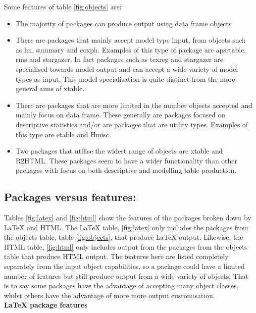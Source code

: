 \documentclass{memoir}\usepackage[]{graphicx}\usepackage[]{color}
\newcommand{\pkg}[1]{{\fontseries{b}\selectfont #1}}
\newcommand{\latex}{\LaTeX\xspace}
\begin{document}
Some features of table \ref{fig:objects} are:
\begin{itemize}
\item The majority of packages can produce output using data frame objects
\item There are packages that mainly accept model type input, from objects such as lm, summary and coxph. Examples of this type of package are \pkg{apsrtable}\cite{apsrtable}, \pkg{rms}\cite{rms} and \pkg{stargazer}. In fact packages such as \pkg{texreg}\cite{texreg} and \pkg{stargazer} are specialised towards model output and can accept a wide variety of model types as input. This model specialisation is quite distinct from the more general aims of \pkg{xtable}.
\item There are packages that are more limited in the number objects accepted and mainly focus on data frame. These generally are packages focused on descriptive statistics and/or are packages that are utility types. Examples of this type are \pkg{etable}\cite{etable} and \pkg{Hmisc}\cite{Hmisc}.
\item Two packages that utilise the widest range of objects are \pkg{xtable} and \pkg{R2HTML}\cite{R2HTML}. These packages seem to have a wider functionality than other packages with focus on both descriptive and modelling table production.
\end{itemize}


\subsection{Packages versus features:}

\vspace{10 pt}

Tables \ref{fig:latex} and \ref{fig:html} show the features of the packages broken down by \latex and HTML. The \latex table, \ref{fig:latex} only includes the packages from the objects table, table \ref{fig:objects}, that produce \latex output. Likewise, the HTML table, \ref{fig:html} only includes output from the packages from the objects table that produce HTML output. The features here are listed completely separately from the input object capabilities, so a package could have a limited number of features but still produce output from a wide variety of objects. That is to say some packages have the advantage of accepting many object classes, whilst others have the advantage of more more output customisation.\\


\textbf{\latex package features}
\end{document}
